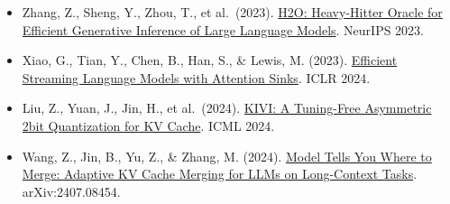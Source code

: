 \vspace{0.25em}
\begin{itemize}
\tightlist
\item
  Zhang, Z., Sheng, Y., Zhou, T., et al.~(2023). \href{https://arxiv.org/abs/2306.14048}{H2O: Heavy-Hitter Oracle for Efficient Generative Inference of Large Language Models}. NeurIPS 2023.
\item
  Xiao, G., Tian, Y., Chen, B., Han, S., \& Lewis, M. (2023). \href{https://arxiv.org/abs/2309.17453}{Efficient Streaming Language Models with Attention Sinks}. ICLR 2024.
\item
  Liu, Z., Yuan, J., Jin, H., et al.~(2024). \href{https://arxiv.org/abs/2402.02750}{KIVI: A Tuning-Free Asymmetric 2bit Quantization for KV Cache}. ICML 2024.
\item
  Wang, Z., Jin, B., Yu, Z., \& Zhang, M. (2024). \href{https://arxiv.org/abs/2407.08454}{Model Tells You Where to Merge: Adaptive KV Cache Merging for LLMs on Long-Context Tasks}. arXiv:2407.08454.
\end{itemize}

\clearpage
